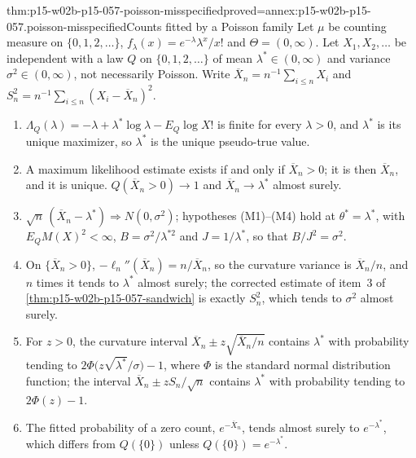 \begin{hbtheorem}{thm:p15-w02b-p15-057-poisson-misspecified}{proved=annex:p15-w02b-p15-057.poisson-misspecified}{Counts fitted by a Poisson family}
Let \(\mu\) be counting measure on \(\{0,1,2,\ldots\}\),
\(f_\lambda(x)=e^{-\lambda}\lambda^x/x!\) and \(\Theta=(0,\infty)\). Let
\(X_1,X_2,\ldots\) be independent with a law \(Q\) on
\(\{0,1,2,\ldots\}\) of mean \(\lambda^*\in(0,\infty)\) and variance
\(\sigma^2\in(0,\infty)\), not necessarily Poisson. Write
\(\overline X_n=n^{-1}\sum_{i\leq n}X_i\) and
\(S_n^2=n^{-1}\sum_{i\leq n}(X_i-\overline X_n)^2\).
\begin{enumerate}
\item \(\Lambda_Q(\lambda)=-\lambda+\lambda^*\log\lambda-E_Q\log X!\) is
 finite for every \(\lambda>0\), and \(\lambda^*\) is its unique
 maximizer, so \(\lambda^*\) is the unique pseudo-true value.
\item A maximum likelihood estimate exists if and only if
 \(\overline X_n>0\); it is then \(\overline X_n\), and it is unique.
 \(Q(\overline X_n>0)\to1\) and \(\overline X_n\to\lambda^*\) almost
 surely.
\item \(\sqrt n\,(\overline X_n-\lambda^*)\Rightarrow N(0,\sigma^2)\);
 hypotheses (M1)--(M4) hold at \(\theta^*=\lambda^*\), with
 \(E_QM(X)^2<\infty\), \(B=\sigma^2/\lambda^{*2}\) and
 \(J=1/\lambda^*\), so that \(B/J^2=\sigma^2\).
\item On \(\{\overline X_n>0\}\),
 \(-\ell_n''(\overline X_n)=n/\overline X_n\), so the curvature variance
 is \(\overline X_n/n\), and \(n\) times it tends to \(\lambda^*\) almost
 surely; the corrected estimate of item~3 of
 \cref{thm:p15-w02b-p15-057-sandwich} is exactly \(S_n^2\), which tends to
 \(\sigma^2\) almost surely.
\item For \(z>0\), the curvature interval
 \(\overline X_n\pm z\sqrt{\overline X_n/n}\) contains \(\lambda^*\) with
 probability tending to \(2\Phi\bigl(z\sqrt{\lambda^*}/\sigma\bigr)-1\),
 where \(\Phi\) is the standard normal distribution function; the
 interval \(\overline X_n\pm zS_n/\sqrt n\) contains \(\lambda^*\) with
 probability tending to \(2\Phi(z)-1\).
\item The fitted probability of a zero count, \(e^{-\overline X_n}\),
 tends almost surely to \(e^{-\lambda^*}\), which differs from \(Q(\{0\})\)
 unless \(Q(\{0\})=e^{-\lambda^*}\).
\end{enumerate}
\end{hbtheorem}

